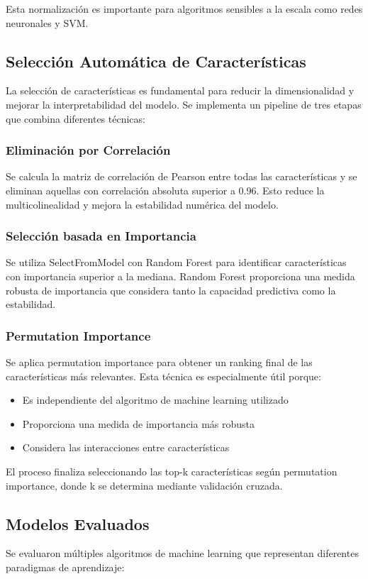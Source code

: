 \documentclass[conference]{IEEEtran}
\begin{document}
	Esta normalización es importante para algoritmos sensibles a la escala como redes neuronales y SVM.
	
	\subsection{Selección Automática de Características}
	La selección de características es fundamental para reducir la dimensionalidad y mejorar la interpretabilidad del modelo. Se implementa un pipeline de tres etapas que combina diferentes técnicas:
	
	\subsubsection{Eliminación por Correlación}
	Se calcula la matriz de correlación de Pearson entre todas las características y se eliminan aquellas con correlación absoluta superior a 0.96. Esto reduce la multicolinealidad y mejora la estabilidad numérica del modelo.
	
	\subsubsection{Selección basada en Importancia}
	Se utiliza SelectFromModel con Random Forest para identificar características con importancia superior a la mediana. Random Forest proporciona una medida robusta de importancia que considera tanto la capacidad predictiva como la estabilidad.
	
	\subsubsection{Permutation Importance}
	Se aplica permutation importance para obtener un ranking final de las características más relevantes. Esta técnica es especialmente útil porque:
	\begin{itemize}
		\item Es independiente del algoritmo de machine learning utilizado
		\item Proporciona una medida de importancia más robusta
		\item Considera las interacciones entre características
	\end{itemize}
	
	El proceso finaliza seleccionando las top-k características según permutation importance, donde k se determina mediante validación cruzada.
	
	\subsection{Modelos Evaluados}
	Se evaluaron múltiples algoritmos de machine learning que representan diferentes paradigmas de aprendizaje:
	
\end{document}
